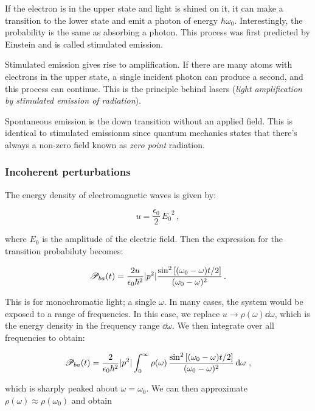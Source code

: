 \documentclass[12pt, titlepage]{article}
\begin{document}
If the electron is in the upper state and light is shined on it, it can make a transition to the lower state and emit a photon of energy $\hbar\omega_0$. Interestingly, the probability is the same as absorbing a photon. This process was first predicted by Einstein and is called stimulated emission.


Stimulated emission gives rise to amplification. If there are many atoms with electrons in the upper state, a single incident photon can produce a second, and this process can continue. This is the principle behind lasers (\textit{light amplification by stimulated emission of radiation}).

Spontaneous emission is the down transition without an applied field. This is identical to stimulated emissionm since quantum mechanics states that there's always a non-zero field known as \textit{zero point} radiation.

\subsubsection{Incoherent perturbations}
The energy density of electromagnetic waves is given by:

\begin{equation}
	u = \frac{\epsilon_0}{2}\,{E_0}^2 \,,
\end{equation}

where $E_0$ is the amplitude of the electric field. Then the expression for the transition probabiluty becomes:

\begin{equation}
	\mathscr{P}_{ba}(t) = \frac{2u}{\epsilon_0\hbar^2}|p^2|\frac{\sin^2\qty[(\omega_0-\omega)t/2]}{(\omega_0 - \omega)^2} \,.
\end{equation}

This is for monochromatic light; a single $\omega$. In many cases, the system would be exposed to a range of frequencies. In this case, we replace $u \rightarrow \rho(\omega)\dd{\omega}$, which is the energy density in the frequency range $\dd{\omega}$. We then integrate over all frequencies to obtain:

\begin{equation*}
	\mathscr{P}_{ba}(t) = \frac{2}{\epsilon_0\hbar^2}|p^2|\int_{0}^{\infty}\rho(\omega)\,\frac{\sin^2\qty[(\omega_0-\omega)t/2]}{(\omega_0 - \omega)^2} \dd{\omega}\,,
\end{equation*}

which is sharply peaked about $\omega = \omega_0$. We can then approximate $\rho(\omega) \approx \rho(\omega_0)$ and obtain
\end{document}
